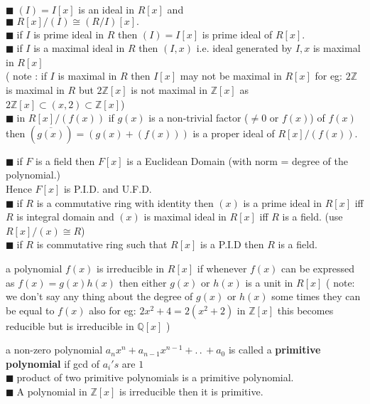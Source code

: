\documentclass[11pt]{extarticle}
\newcommand{\Z}{\mathbb{Z}}
\newcommand{\Q}{\mathbb{Q}}
\newcommand{\w}[1]{\text{#1}}
\newcommand{\ck}{.\,.\,}
\newcommand{\snote}[1]{{\footnotesize(#1)}}
\newcommand{\tbx}[2][]{
	\begin{tcolorbox}[enhanced,breakable,size=small,colback=black!2!white,title={#1},arc is angular, arc=1.5mm,drop fuzzy shadow]
		#2
	\end{tcolorbox}
}
\newcommand{\y}{$\blacksquare\;$}
\begin{document}
\begin{multicols}{2}
{	\y $ (I)= I[x] $ is an ideal in $ R[x] $ and\\
	\y	$ R[x]/(I)\cong (R/I)[x]. $\\
\y if $ I $ is prime ideal in $ R $ then $ (I) =I[x]$ is prime ideal of $ R[x]. $\\
\y if $ I $ is a maximal ideal in $ R $ then $ (I,x) $ i.e. ideal generated by $ I,x $ is maximal in $ R[x] $\\
			\snote{ note : if $ I $ is maximal in $ R $ then $ I[x] $ may not be maximal in $ R[x] $ for eg:  $ 2\Z $ is maximal in $ R $ but $ 2\Z[x] $ is not maximal in $ \Z[x] $ as $ 2\Z[x] \subset (x,2) \subset \Z[x]$}\\
\y in $ R[x]/(f(x)) $ if $g(x)  $ is a non-trivial factor \snote{$ \neq 0\w{ or } f(x) $} of $ f(x) $ then $ (\overline{g(x)})=(g(x)+(f(x))) $ is a proper ideal of $ R[x]/(f(x)) $.
			} 
\tbx[Characterisation of Poly rings ]{
	\y if $ F $ is a field then $ F[x] $ is a Euclidean Domain \snote{with norm = degree of the polynomial.}\\
			Hence $ F[x] $ is P.I.D. and U.F.D.\\
\y if $R  $ is a commutative ring with identity then $ (x )$ is a prime ideal in $ R[x] $ iff $ R $ is integral domain and $ (x) $ is maximal ideal in $ R[x] $ iff $ R $ is a field. \snote{use $ R[x]/(x)\cong R $}\\
\y if $ R $ is commutative ring such that $ R[x] $ is a P.I.D then $ R $ is a field.
			} 
\tbx[Irreducibility]{a polynomial $ f(x) $ is irreducible in $ R[x] $ if whenever $ f(x) $ can be expressed as $ f(x)=g(x)h(x) $ then either $ g(x) $ or $ h(x) $ is a unit in $ R[x] $ \snote{ note: we don't say any thing about the degree of $ g(x) $ or $ h(x) $ some times they can be equal to $ f(x) $ also for eg: $ 2x^2+4=2(x^2+2) $ in $ \Z[x] $ this becomes reducible but is irreducible in $ \Q[x] $ }}
 
\tbx[Primitive Polynomial]{a non-zero polynomial $ a_nx^n+a_{n-1}x^{n-1}+\ck +a_0 $ is called a \textbf{primitive polynomial} if gcd of $ a_i's $ are $ 1 $\\
\y product of two primitive polynomials is a primitive polynomial.\\
\y A polynomial in $ \Z[x] $ is irreducible then it is primitive.}
 

\end{multicols}
\end{document}
